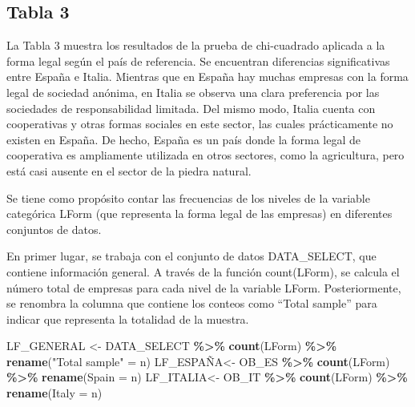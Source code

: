 \documentclass[
]{article}
\newenvironment{Shaded}{\begin{snugshade}}{\end{snugshade}}
\newcommand{\AttributeTok}[1]{\textcolor[rgb]{0.13,0.29,0.53}{#1}}
\newcommand{\FunctionTok}[1]{\textcolor[rgb]{0.13,0.29,0.53}{\textbf{#1}}}
\newcommand{\NormalTok}[1]{#1}
\newcommand{\OtherTok}[1]{\textcolor[rgb]{0.56,0.35,0.01}{#1}}
\newcommand{\SpecialCharTok}[1]{\textcolor[rgb]{0.81,0.36,0.00}{\textbf{#1}}}
\newcommand{\StringTok}[1]{\textcolor[rgb]{0.31,0.60,0.02}{#1}}
\begin{document}
\subsection{Tabla 3}\label{tabla-3}

La Tabla 3 muestra los resultados de la prueba de chi-cuadrado aplicada
a la forma legal según el país de referencia. Se encuentran diferencias
significativas entre España e Italia. Mientras que en España hay muchas
empresas con la forma legal de sociedad anónima, en Italia se observa
una clara preferencia por las sociedades de responsabilidad limitada.
Del mismo modo, Italia cuenta con cooperativas y otras formas sociales
en este sector, las cuales prácticamente no existen en España. De hecho,
España es un país donde la forma legal de cooperativa es ampliamente
utilizada en otros sectores, como la agricultura, pero está casi ausente
en el sector de la piedra natural.

Se tiene como propósito contar las frecuencias de los niveles de la
variable categórica LForm (que representa la forma legal de las
empresas) en diferentes conjuntos de datos.

En primer lugar, se trabaja con el conjunto de datos DATA\_SELECT, que
contiene información general. A través de la función count(LForm), se
calcula el número total de empresas para cada nivel de la variable
LForm. Posteriormente, se renombra la columna que contiene los conteos
como ``Total sample'' para indicar que representa la totalidad de la
muestra.

\begin{Shaded}
\begin{Highlighting}[]
\NormalTok{LF\_GENERAL }\OtherTok{\textless{}{-}}\NormalTok{ DATA\_SELECT }\SpecialCharTok{\%\textgreater{}\%} \FunctionTok{count}\NormalTok{(LForm) }\SpecialCharTok{\%\textgreater{}\%} \FunctionTok{rename}\NormalTok{(}\StringTok{"Total sample"} \OtherTok{=}\NormalTok{ n)}
\NormalTok{LF\_ESPAÑA}\OtherTok{\textless{}{-}}\NormalTok{ OB\_ES }\SpecialCharTok{\%\textgreater{}\%} \FunctionTok{count}\NormalTok{(LForm) }\SpecialCharTok{\%\textgreater{}\%} \FunctionTok{rename}\NormalTok{(}\AttributeTok{Spain =}\NormalTok{ n)}
\NormalTok{LF\_ITALIA}\OtherTok{\textless{}{-}}\NormalTok{ OB\_IT }\SpecialCharTok{\%\textgreater{}\%} \FunctionTok{count}\NormalTok{(LForm) }\SpecialCharTok{\%\textgreater{}\%} \FunctionTok{rename}\NormalTok{(}\AttributeTok{Italy =}\NormalTok{ n)}
\end{Highlighting}
\end{Shaded}
\end{document}

